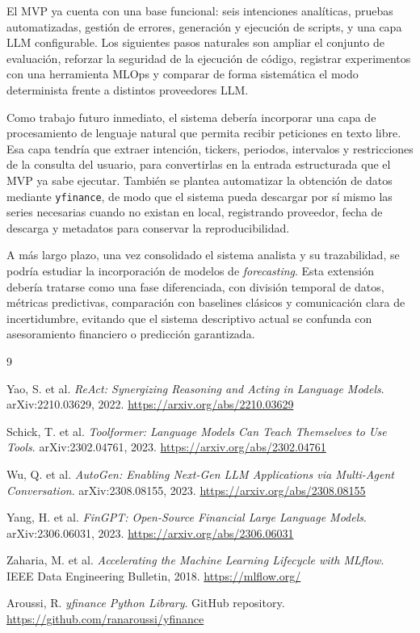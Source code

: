 \documentclass[11pt,a4paper]{article}
\begin{document}
El MVP ya cuenta con una base funcional: seis intenciones anal\'iticas, pruebas automatizadas, gesti\'on de errores, generaci\'on y ejecuci\'on de scripts, y una capa LLM configurable. Los siguientes pasos naturales son ampliar el conjunto de evaluaci\'on, reforzar la seguridad de la ejecuci\'on de c\'odigo, registrar experimentos con una herramienta MLOps y comparar de forma sistem\'atica el modo determinista frente a distintos proveedores LLM.

Como trabajo futuro inmediato, el sistema deber\'ia incorporar una capa de procesamiento de lenguaje natural que permita recibir peticiones en texto libre. Esa capa tendr\'ia que extraer intenci\'on, tickers, periodos, intervalos y restricciones de la consulta del usuario, para convertirlas en la entrada estructurada que el MVP ya sabe ejecutar. Tambi\'en se plantea automatizar la obtenci\'on de datos mediante \texttt{yfinance}, de modo que el sistema pueda descargar por s\'i mismo las series necesarias cuando no existan en local, registrando proveedor, fecha de descarga y metadatos para conservar la reproducibilidad.

A m\'as largo plazo, una vez consolidado el sistema analista y su trazabilidad, se podr\'ia estudiar la incorporaci\'on de modelos de \textit{forecasting}. Esta extensi\'on deber\'ia tratarse como una fase diferenciada, con divisi\'on temporal de datos, m\'etricas predictivas, comparaci\'on con baselines cl\'asicos y comunicaci\'on clara de incertidumbre, evitando que el sistema descriptivo actual se confunda con asesoramiento financiero o predicci\'on garantizada.

\begin{thebibliography}{9}

Yao, S. et al. \textit{ReAct: Synergizing Reasoning and Acting in Language Models}. arXiv:2210.03629, 2022.
\url{https://arxiv.org/abs/2210.03629}

Schick, T. et al. \textit{Toolformer: Language Models Can Teach Themselves to Use Tools}. arXiv:2302.04761, 2023.
\url{https://arxiv.org/abs/2302.04761}

Wu, Q. et al. \textit{AutoGen: Enabling Next-Gen LLM Applications via Multi-Agent Conversation}. arXiv:2308.08155, 2023.
\url{https://arxiv.org/abs/2308.08155}

Yang, H. et al. \textit{FinGPT: Open-Source Financial Large Language Models}. arXiv:2306.06031, 2023.
\url{https://arxiv.org/abs/2306.06031}

Zaharia, M. et al. \textit{Accelerating the Machine Learning Lifecycle with MLflow}. IEEE Data Engineering Bulletin, 2018.
\url{https://mlflow.org/}

Aroussi, R. \textit{yfinance Python Library}. GitHub repository.
\url{https://github.com/ranaroussi/yfinance}

\end{thebibliography}
\end{document}
